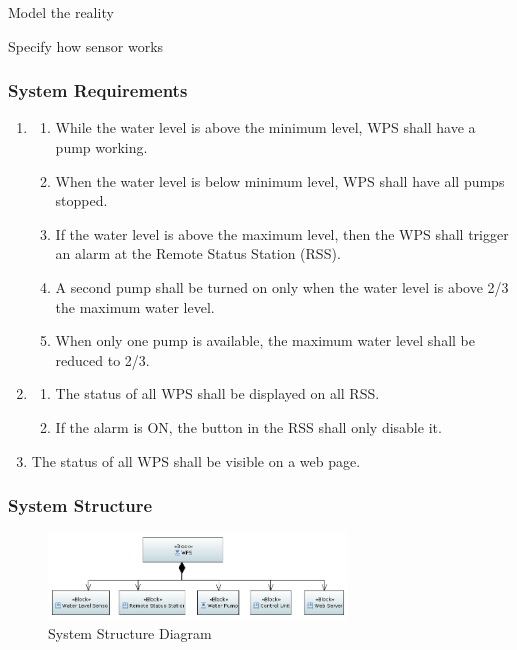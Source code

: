 \documentclass[11pt]{article}
\begin{document}
Model the reality

Specify how sensor works




\subsubsection{System Requirements}

\begin{enumerate}[leftmargin=4em, font=\small, label=\textbf{SR-\arabic*}]
	\setlength\itemsep{.5em}
	\item 
		\begin{enumerate}[leftmargin=1.5em, font=\small, label=\textbf{.\arabic*:}]
		\setlength\itemsep{0em}
		\item While the water level is above the minimum level, WPS shall have a pump working.
		\item When the water level is below minimum level, WPS shall have all pumps stopped.
		\item If the water level is above the maximum level, then the WPS shall trigger an alarm at the Remote Status Station (RSS).
		\item A second pump shall be turned on only when the water level is above 2/3 the maximum water level.
		\item When only one pump is available, the maximum water level shall be reduced to 2/3.
		\end{enumerate}
	\item
		\begin{enumerate}[leftmargin=1.5em, font=\small, label=\textbf{.\arabic*:}]
		\setlength\itemsep{0em}
		\item The status of all WPS shall be displayed on all RSS.
		\item If the alarm is ON, the button in the RSS shall only disable it.
		\end{enumerate}
	\item The status of all WPS shall be visible on a web page.

\end{enumerate}

\subsubsection{System Structure}

\begin{figure}[H]
  \centering
  \includegraphics[width=300px]{../diagrams/system-structure.png}
  \caption{System Structure Diagram}
  \label{fig:System Structure Diagram}
\end{figure}
\end{document}
